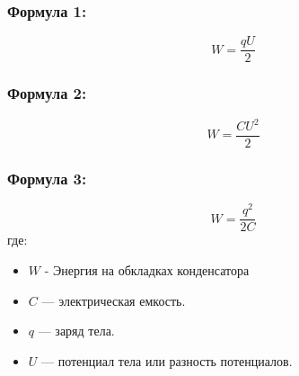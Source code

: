 \documentclass[a4paper,12pt]{article}
\begin{document}
\subsubsection*{Формула 1:}
\vspace{-0.05em}
$$ W = \frac{qU}{2} $$
\subsubsection*{Формула 2:}
\vspace{-0.05em}
$$ W = \frac{CU^2}{2} $$
\subsubsection*{Формула 3:}
\vspace{-0.05em}
$$ W = \frac{q^2}{2C} $$
где:
\begin{itemize}
    \item $W$ - Энергия на обкладках конденсатора
    \item $C$ — электрическая емкость.
    \item $q$ — заряд тела.
    \item $U$ — потенциал тела или разность потенциалов.
\end{itemize}
\end{document}
